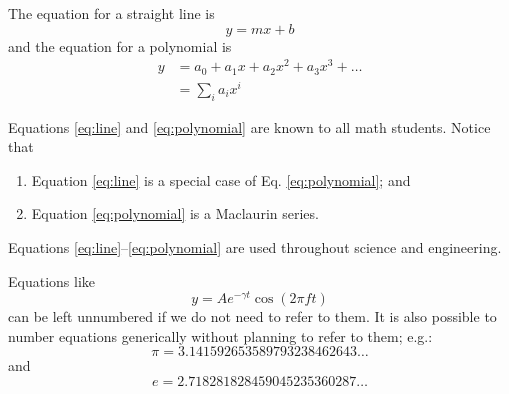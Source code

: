 The equation for a straight line is
\begin{equation} y = mx + b \label{eq:line}\end{equation} and the
equation for a polynomial is \begin{equation} \begin{aligned}
     y &= a_0 + a_1 x + a_2 x^2 + a_3 x^3 + \dots \\
     &= \sum_i a_i x^i
   \end{aligned}
\label{eq:polynomial}\end{equation}

Equations \ref{eq:line} and \ref{eq:polynomial} are known to all math
students. Notice that

\begin{enumerate}
\def\labelenumi{\arabic{enumi}.}
\tightlist
\item
  Equation \ref{eq:line} is a special case of Eq. \ref{eq:polynomial};
  and
\item
  Equation \ref{eq:polynomial} is a Maclaurin series.
\end{enumerate}

Equations \ref{eq:line}--\ref{eq:polynomial} are used throughout science
and engineering.

Equations like \[ y = A e^{-\gamma t}\cos(2\pi f t) \] can be left
unnumbered if we do not need to refer to them. It is also possible to
number equations generically without planning to refer to them; e.g.:
\begin{equation} \pi = 3.141592653589793238462643\dots \label{eq:__-1053774000882284256__}\end{equation}
and
\begin{equation} e =   2.718281828459045235360287\dots \label{eq:__2430461880868312730__}\end{equation}

